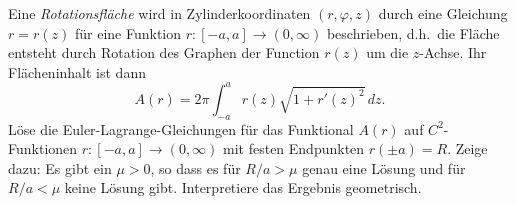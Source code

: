 \begin{prob}
Eine {\em Rotationsfl\"ache} wird in Zylinderkoordinaten
$(r,\varphi,z)$ durch eine Gleichung $r=r(z)$ f\"ur eine Funktion
$r:[-a,a]\to(0,\infty)$ beschrieben, d.h.~die Fl\"ache entsteht durch
Rotation des Graphen der Function $r(z)$ um die $z$-Achse. Ihr
Fl\"acheninhalt ist dann
$$
   A(r) = 2\pi\int_{-a}^ar(z)\sqrt{1+r'(z)^2}\,dz.
$$
L\"ose die Euler-Lagrange-Gleichungen f\"ur das Funktional $A(r)$ auf
$C^2$-Funktionen $r:[-a,a]\to(0,\infty)$ mit festen Endpunkten $r(\pm a)=R$.
Zeige dazu: Es gibt ein $\mu>0$, so dass es f\"ur $R/a>\mu$ genau eine
L\"osung und f\"ur $R/a<\mu$ keine L\"osung gibt. Interpretiere das
Ergebnis geometrisch. 
\end{prob}
